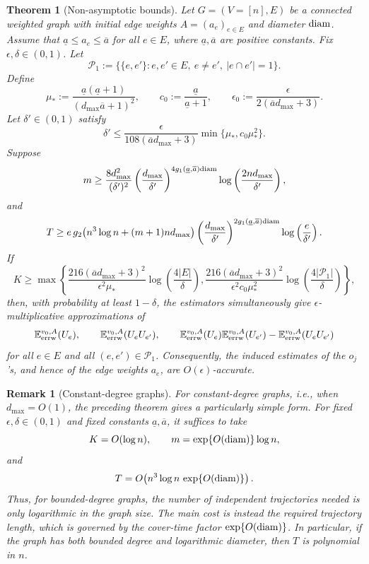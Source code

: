 \documentclass[a4paper, 11pt]{article}
\newcommand{\E}{\mathbb{E}}
\newcommand{\Eerrw}{\E_{\textnormal{errw}}}
\newcommand{\diam}{\textnormal{diam}}
\newtheorem{thm}{Theorem}[section]
\newtheorem{rem}{Remark}[thm]
\begin{document}
\vspace{.3em}
\begin{thm}[Non-asymptotic bounds]
\label{thm:nonasym}
Let $G=(V=[n],E)$ be a connected weighted graph with initial edge weights
$A=(a_e)_{e\in E}$ and diameter $\diam$. Assume that
$\underline a\le a_e\le\overline a$ for all $e\in E$, where
$\underline a,\overline a$ are positive constants. Fix \(\epsilon,\delta\in(0,1)\). Let
\[
\mathcal P_1:=\{\{e,e'\}:e,e'\in E,\ e\neq e',\ |e\cap e'|=1\}.
\]
Define
\[
\mu_*:=\frac{\underline a(\underline a+1)}{(d_{\max}\overline a+1)^2},
\qquad
c_0:=\frac{\underline a}{\underline a+1},
\qquad
\epsilon_0:=\frac{\epsilon}{2(\overline a d_{\max}+3)}.
\]
Let \(\delta'\in(0,1)\) satisfy
\[
\delta'
\le
\frac{\epsilon}{108(\overline a d_{\max}+3)}
\min\{\mu_*,c_0\mu_*^2\}.
\]
Suppose
\[
m\ge
\frac{8d_{\max}^2}{(\delta')^2}
\left(\frac{d_{\max}}{\delta'}\right)^{4g_1(\underline a,\overline a)\diam}
\log\left(\frac{2nd_{\max}}{\delta'}\right),
\]
and
\[
T\ge
e\,g_2\big(n^3\log n+(m+1)nd_{\max}\big)
\left(\frac{d_{\max}}{\delta'}\right)^{2g_1(\underline a,\overline a)\diam}
\log\left(\frac{e}{\delta'}\right).
\]
If
\[
K
\ge
\max\left\{
\frac{216(\overline a d_{\max}+3)^2}{\epsilon^2\mu_*}
\log\left(\frac{4|E|}{\delta}\right),
\frac{216(\overline a d_{\max}+3)^2}{\epsilon^2c_0\mu_*^2}
\log\left(\frac{4|\mathcal P_1|}{\delta}\right)
\right\},
\]
then, with probability at least \(1-\delta\), the estimators simultaneously give
\(\epsilon\)-multiplicative approximations of
\[
\Eerrw^{v_0,A}(U_e),\qquad
\Eerrw^{v_0,A}(U_eU_{e'}),\qquad
\Eerrw^{v_0,A}(U_e)\Eerrw^{v_0,A}(U_{e'})
-\Eerrw^{v_0,A}(U_eU_{e'})
\]
for all \(e\in E\) and all \((e,e')\in\mathcal P_1\).
Consequently, the induced estimates of the \(o_j\)'s, and hence of the edge weights
\(a_e\), are \(O(\epsilon)\)-accurate.
\end{thm}

\medskip
\begin{rem}[Constant-degree graphs]
For constant-degree graphs, i.e., when $d_{\max}=O(1)$, the preceding theorem gives a particularly simple form. For fixed $\epsilon,\delta\in(0,1)$ and fixed constants $\underline a,\overline a$, it suffices to take
\[
K=O(\log n),
\qquad
m=\exp\{O(\diam)\}\log n,
\]
and
\[
T
=
O\!\left(
n^3\log n\,\exp\{O(\diam)\}
\right).
\]
Thus, for bounded-degree graphs, the number of independent trajectories needed is only logarithmic in the graph size. The main cost is instead the required trajectory length, which is governed by the cover-time factor $\exp\{O(\diam)\}$. In particular, if the graph has both bounded degree and logarithmic diameter, then \(T\) is polynomial in \(n\).
\end{rem}
\end{document}
